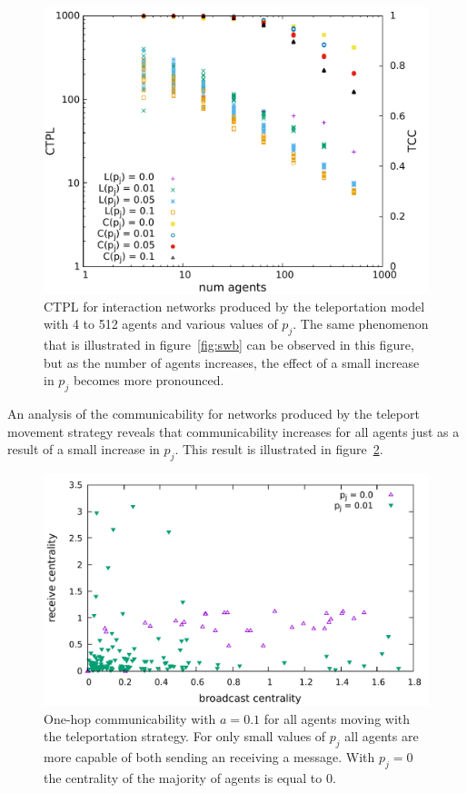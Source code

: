 \documentclass[conference]{IEEEtran}
\begin{document}
\begin{figure}
  \includegraphics[width=\columnwidth]{teleport-scaling.pdf}
  \caption{CTPL for interaction networks produced by the teleportation
    model with 4 to 512 agents and various values of $p_j$. The same
    phenomenon that is illustrated in figure~\ref{fig:swb} can be
    observed in this figure, but as the number of agents increases,
    the effect of a small increase in $p_j$ becomes more pronounced.}
  \label{fig:teleport-scale}
\end{figure}

An analysis of the communicability for networks produced by the
teleport movement strategy reveals that communicability increases for
all agents just as a result of a small increase in $p_j$. This result
is illustrated in figure~\ref{fig:teleport-comm}.
\begin{figure}
  \includegraphics[width=\columnwidth]{teleport_centrality-oh.pdf}
  \caption{One-hop communicability with $a = 0.1$ for all agents
    moving with the teleportation strategy. For only small values of
    $p_j$ all agents are more capable of both sending an receiving a
    message. With $p_j = 0$ the centrality of the majority of agents
    is equal to 0.}
  \label{fig:teleport-comm}
\end{figure}
\end{document}
